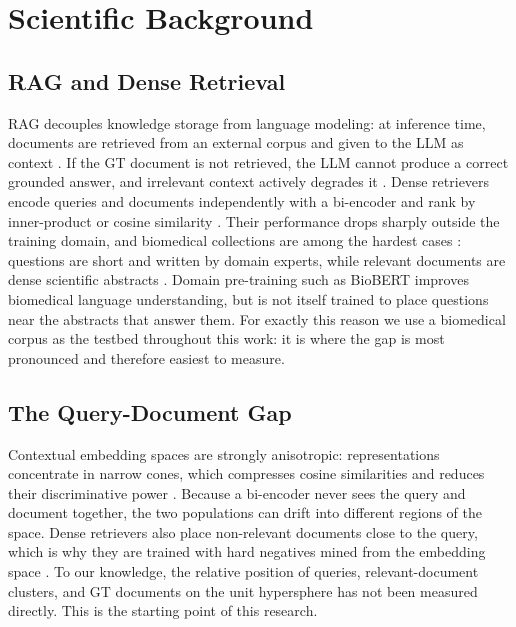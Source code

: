 \documentclass[11pt,a4paper]{article}
\begin{document}
\section{Scientific Background}

\subsection{RAG and Dense Retrieval}
RAG decouples knowledge storage from language modeling: at inference time, documents are retrieved from an external corpus and given to the LLM as context \citep{lewis2020rag,shi2024replug}. If the GT document is not retrieved, the LLM cannot produce a correct grounded answer, and irrelevant context actively degrades it \citep{shi2023distractors}. Dense retrievers encode queries and documents independently with a bi-encoder and rank by inner-product or cosine similarity \citep{karpukhin2020dpr,reimers2019sbert}. Their performance drops sharply outside the training domain, and biomedical collections are among the hardest cases \citep{thakur2021beir}: questions are short and written by domain experts, while relevant documents are dense scientific abstracts \citep{tsatsaronis2015bioasq,nentidis2023bioasq11}. Domain pre-training such as BioBERT \citep{lee2020biobert} improves biomedical language understanding, but is not itself trained to place questions near the abstracts that answer them. For exactly this reason we use a biomedical corpus as the testbed throughout this work: it is where the gap is most pronounced and therefore easiest to measure.

\subsection{The Query-Document Gap}
Contextual embedding spaces are strongly anisotropic: representations concentrate in narrow cones, which compresses cosine similarities and reduces their discriminative power \citep{ethayarajh2019contextual}. Because a bi-encoder never sees the query and document together, the two populations can drift into different regions of the space. Dense retrievers also place non-relevant documents close to the query, which is why they are trained with hard negatives mined from the embedding space \citep{xiong2021ance}. To our knowledge, the relative position of queries, relevant-document clusters, and GT documents on the unit hypersphere has not been measured directly. This is the starting point of this research.
\end{document}
